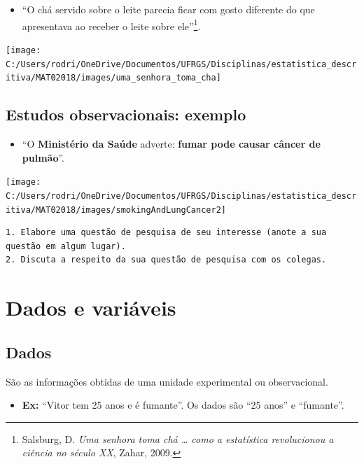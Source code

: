 \documentclass[]{tufte-book}
\providecommand{\tightlist}{%
  \setlength{\itemsep}{0pt}\setlength{\parskip}{0pt}}
\begin{document}
\begin{itemize}
\tightlist
\item
  ``O chá servido sobre o leite parecia ficar com gosto diferente do que
  apresentava ao receber o leite sobre ele''\footnote{Salsburg, D.
    \emph{Uma senhora toma chá \ldots{} como a estatística revolucionou
    a ciência no século XX}, Zahar, 2009.}.
\end{itemize}

\begin{center}\texttt{[image: C:/Users/rodri/OneDrive/Documentos/UFRGS/Disciplinas/estatistica\_descritiva/MAT02018/images/uma\_senhora\_toma\_cha]} \end{center}

\hypertarget{estudos-observacionais-exemplo}{%
\subsection{Estudos observacionais:
exemplo}\label{estudos-observacionais-exemplo}}

\begin{itemize}
\tightlist
\item
  ``O \textbf{Ministério da Saúde} adverte: \textbf{fumar pode causar
  câncer de pulmão}''.
\end{itemize}

\begin{center}\texttt{[image: C:/Users/rodri/OneDrive/Documentos/UFRGS/Disciplinas/estatistica\_descritiva/MAT02018/images/smokingAndLungCancer2]} \end{center}

\begin{verbatim}
1. Elabore uma questão de pesquisa de seu interesse (anote a sua questão em algum lugar).
2. Discuta a respeito da sua questão de pesquisa com os colegas.
\end{verbatim}

\hypertarget{dados-e-variuxe1veis}{%
\section{Dados e variáveis}\label{dados-e-variuxe1veis}}

\begin{block}

\hypertarget{dados}{%
\subsection{Dados}\label{dados}}

São as informações obtidas de uma unidade experimental ou
observacional.\\

\begin{itemize}
\tightlist
\item
  \textbf{Ex:} ``Vitor tem 25 anos e é fumante''. Os dados são ``25
  anos'' e ``fumante''.
\end{itemize}

\end{block}
\end{document}
